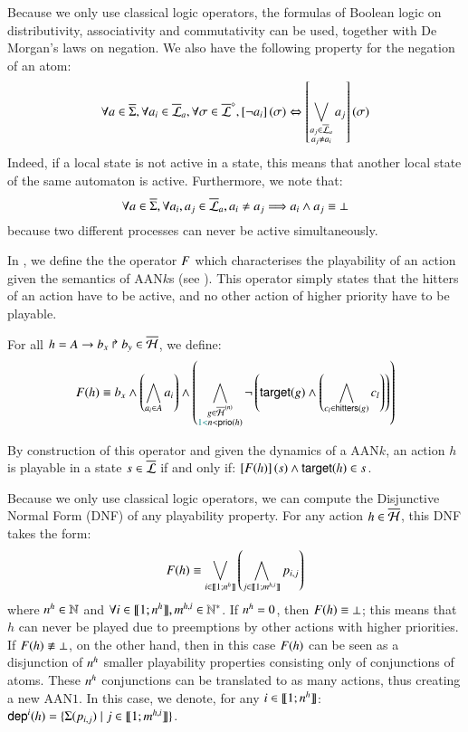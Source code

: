 Because we only use classical logic operators, the formulas of Boolean logic on 
distributivity, associativity and commutativity can be used, together with De Morgan's laws on negation.
We also have the following property for the negation of an atom:
\[\forall a \in \overline{\Sigma}, \forall a_i \in \overline{\mathcal{L}}_a, \forall \sigma \in \overline{\mathcal{L}}^{\diamond},
  \left[\neg a_i\right](\sigma) \Leftrightarrow \left[\bigvee_{\substack{a_j \in \overline{\mathcal{L}}_a\\a_j \neq a_i}} a_j\right](\sigma)\]
Indeed, if a local state is not active in a state, this means that another local state of the same automaton is active.
Furthermore, we note that:
\[\forall a \in \overline{\Sigma}, \forall a_i, a_j \in \overline{\mathcal{L}}_a,
  a_i \neq a_j \Longrightarrow a_i \wedge a_j \equiv \bot \]
because two different processes can never be active simultaneously.

In , we define the the operator $F$ which characterises the playability of an action
given the semantics of AAN$k$s (see ).
This operator simply states that the hitters of an action have to be active,
and no other action of higher priority have to be playable.

\begin{definition}\label{def:fop}
  For all $h = A\rightarrow b_x\Rsh b_y \in \overline{\mathcal{H}}$, we define:
  \[
    F(h) \equiv
    b_x \wedge
    \left(\bigwedge_{a_i \in A} a_i\right)
    \wedge
      \left( \bigwedge_{\substack{g \in \overline{\mathcal{H}}^{(n)}\\\textcolor{teal}{1 <} n < \mathsf{prio}(h)}}
      \neg \left( \mathsf{target}(g) \wedge \left(\bigwedge_{c_l \in \mathsf{hitters}(g)} c_l\right)\right) \right)
  \]
\end{definition}
%
By construction of this operator and given the dynamics of a AAN$k$,
an action $h$ is playable in a state $s \in \overline{\mathcal{L}}$ if and only if: $\left[F(h)\right](s) \wedge \mathsf{target}(h) \in s$.

Because we only use classical logic operators, we can compute the Disjunctive Normal Form (DNF) of any playability property.
For any action $h \in \overline{\mathcal{H}}$, this DNF takes the form:
\[F(h) \equiv \bigvee_{i \in \llbracket 1; n^{h} \rrbracket} \left( \bigwedge_{j \in \llbracket 1; m^{h,i} \rrbracket} p_{i,j} \right)\]
where $n^{h} \in \mathbb{N}$ and $\forall i \in \llbracket 1; n^{h} \rrbracket, m^{h,i} \in \mathbb{N}^*$.
If $n^{h} = 0$, then $F(h) \equiv \bot$; this means that $h$ can never be played
due to preemptions by other actions with higher priorities.
If $F(h) \not\equiv \bot$, on the other hand, then in this case $F(h)$
can be seen as a disjunction of $n^{h}$ smaller playability properties consisting only of conjunctions of atoms.
These $n^{h}$ conjunctions can be translated to as many actions,
thus creating a new AAN$1$.
In this case, we denote, for any $i \in \llbracket 1; n^{h} \rrbracket$:
$\mathsf{dep}^{i}(h) = \{ \Sigma(p_{i,j}) \mid j \in \llbracket 1; m^{h,i} \rrbracket \}$.

